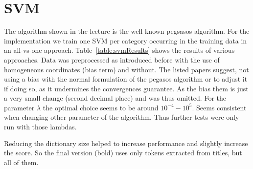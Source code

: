\documentclass{article}
\begin{document}
\section*{SVM}
The algorithm shown in the lecture is the well-known pegsasos algorithm\cite{shalev-shwartz_pegasos:_2011,shalev-shwartz_pegasos:_????}. For the implementation we train one SVM per category occurring in the training data in an all-vs-one approach.
Table~\ref{table:svmResults} shows the results of various approaches.
Data was preprocessed as introduced before with the use of homogeneous coordinates (bias term) and without. The listed papers suggest, not using a bias with the normal formulation of the pegasos algorithm or to adjust it if doing so, as it undermines the convergences guarantee. As the bias them is just a very small change (second decimal place) and was thus omitted. For the parameter $\lambda$ the optimal choice seems to be around $10^{-4} - 10^{5}$. Seems consistent when changing other parameter of the algorithm. Thus further tests were only run with those lambdas.

Reducing the dictionary size helped to increase performance and slightly increase the score. So the final version (bold) uses only tokens extracted from titles, but all of them.
\end{document}
